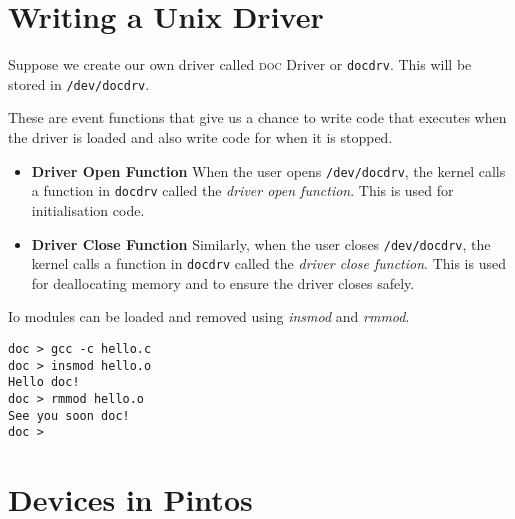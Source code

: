 \section{Writing a Unix Driver}

Suppose we create our own driver called \textsc{doc} Driver or \lstinline{docdrv}. 
This will be stored in \lstinline{/dev/docdrv}. 

These are event functions that give us a chance 
to write code that executes when the driver is loaded and also write code 
for when it is stopped. 

\begin{itemize}   
\renewcommand{\labelitemi}{$\Box$}
\item \textbf{Driver Open Function} When the user opens \lstinline{/dev/docdrv}, 
the kernel calls a function in \lstinline{docdrv} called the
\textit{driver open function}. This is used for initialisation code.
\item \textbf{Driver Close Function} Similarly, when the user closes \lstinline{/dev/docdrv}, 
the kernel calls a function in \lstinline{docdrv} called the 
\textit{driver close function}. This is used for deallocating memory and to ensure 
the driver closes safely.
\end{itemize}

\frmrule

Io modules can be loaded and removed using \textit{insmod} and \textit{rmmod}.

\begin{lstlisting}
doc > gcc -c hello.c
doc > insmod hello.o
Hello doc!
doc > rmmod hello.o
See you soon doc!
doc >
\end{lstlisting}


\section{Devices in Pintos}